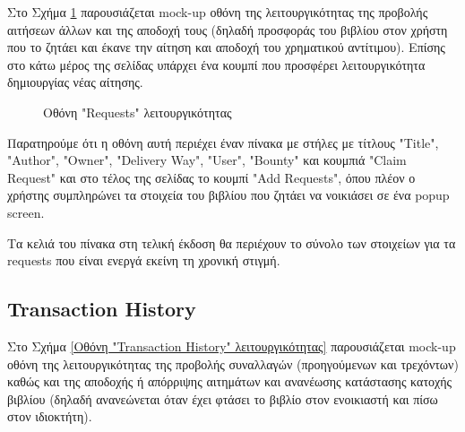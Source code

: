 \documentclass[12pt,a4paper]{article}
\begin{document}
Στο Σχήμα \ref{Οθόνη "Requests" λειτουργικότητας} παρουσιάζεται mock-up οθόνη της λειτουργικότητας της προβολής αιτήσεων άλλων και της αποδοχή τους (δηλαδή προσφοράς του βιβλίου στον χρήστη που το ζητάει και έκανε την αίτηση και αποδοχή του χρηματικού αντίτιμου). Επίσης στο κάτω μέρος της σελίδας υπάρχει ένα κουμπί που προσφέρει λειτουργικότητα δημιουργίας νέας αίτησης.

\begin{figure}[H]
	\caption{Οθόνη "Requests" λειτουργικότητας}
	\label{Οθόνη "Requests" λειτουργικότητας}
\end{figure}

Παρατηρούμε ότι η οθόνη αυτή περιέχει έναν πίνακα με στήλες με τίτλους "Title", "Author", "Owner", "Delivery Way", "User", "Bounty" και κουμπιά "Claim Request" και στο τέλος της σελίδας το κουμπί "Add Requests", όπου πλέον ο χρήστης συμπληρώνει τα στοιχεία του βιβλίου που ζητάει να νοικιάσει σε ένα popup screen.

Τα κελιά του πίνακα στη τελική έκδοση θα περιέχουν το σύνολο των στοιχείων για τα requests που είναι ενεργά εκείνη τη χρονική στιγμή.

\subsection{Transaction History}

Στο Σχήμα \ref{Οθόνη "Transaction History" λειτουργικότητας} παρουσιάζεται mock-up οθόνη της λειτουργικότητας της προβολής συναλλαγών (προηγούμενων και τρεχόντων) καθώς και της αποδοχής ή απόρριψης αιτημάτων και ανανέωσης κατάστασης κατοχής βιβλίου (δηλαδή ανανεώνεται όταν έχει φτάσει το βιβλίο στον ενοικιαστή και πίσω στον ιδιοκτήτη).
\end{document}
